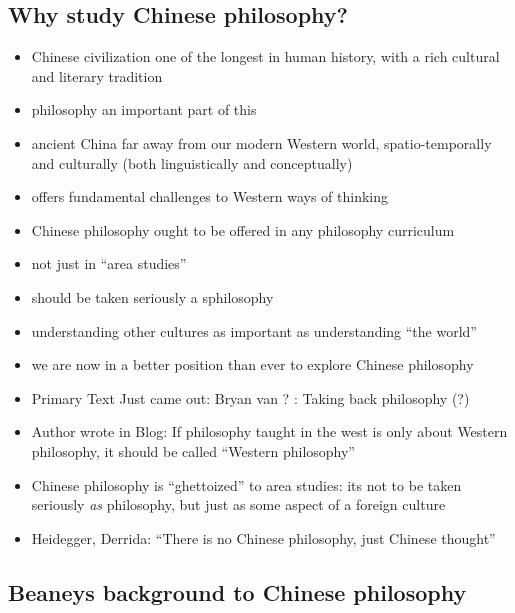\documentclass[emulatestandardclasses]{scrartcl}
\begin{document}
\subsection{Why study Chinese philosophy?}

\begin{itemize}
  \item Chinese civilization one of the longest in human history, with a rich cultural and literary tradition
  \item philosophy an important part of this
  \item ancient China far away from our modern Western world, spatio-temporally and culturally (both linguistically and conceptually)
  \item offers fundamental challenges to Western ways of thinking
  \item Chinese philosophy ought to be offered in any philosophy curriculum
  \item not just in "`area studies"'
  \item should be taken seriously a sphilosophy
  \item understanding other cultures as important as understanding "`the world"'
  \item we are now in a better position than ever to explore Chinese philosophy
  \item Primary Text Just came out: Bryan van ? : Taking back philosophy (?)
  \item Author wrote in Blog: If philosophy taught in the west is only about Western philosophy, it should be called "`Western philosophy"'
  \item Chinese philosophy is "`ghettoized"' to area studies: its not to be taken seriously \emph{as} philosophy, but just as some aspect of a foreign culture
  \item Heidegger, Derrida: "`There is no Chinese philosophy, just Chinese thought"'
\end{itemize}

\subsection{Beaneys background to Chinese philosophy}
\end{document}
